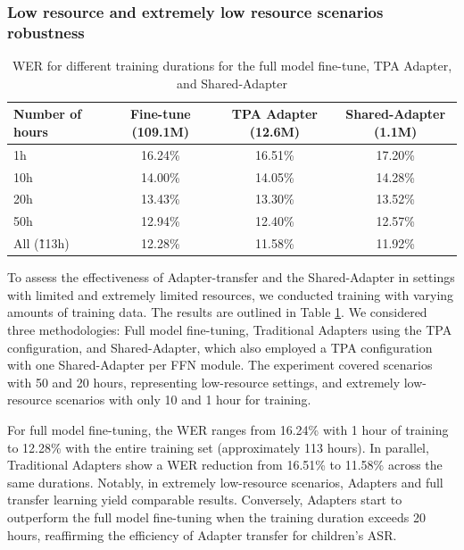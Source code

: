 
\subsubsection{Low resource and extremely low resource scenarios robustness}
\label{sec:hours_PETL}
\begin{table}[ht]
    \centering
    \begin{tabular}{l c c c}
        \hline
        Number of hours & Fine-tune (109.1M) & TPA Adapter (12.6M) & Shared-Adapter (1.1M) \\
        \hline
        1h & 16.24\% & 16.51\% & 17.20\% \\
        10h & 14.00\% & 14.05\% & 14.28\% \\
        20h & 13.43\% & 13.30\% & 13.52\% \\
        50h & 12.94\% & 12.40\% & 12.57\% \\
        All (\~113h) & 12.28\% & 11.58\% & 11.92\% \\
        \hline
    \end{tabular}
    \caption{WER for different training durations for the full model fine-tune, TPA Adapter, and Shared-Adapter}
    \label{tab:training_duration_results}
\end{table}

To assess the effectiveness of Adapter-transfer and the Shared-Adapter in settings with limited and extremely limited resources, we conducted training with varying amounts of training data. The results are outlined in Table \ref{tab:training_duration_results}. We considered three methodologies: Full model fine-tuning, Traditional Adapters using the \ac{TPA} configuration, and Shared-Adapter, which also employed a \ac{TPA} configuration with one Shared-Adapter per \ac{FFN} module. The experiment covered scenarios with 50 and 20 hours, representing low-resource settings, and extremely low-resource scenarios with only 10 and 1 hour for training.

For full model fine-tuning, the \ac{WER} ranges from 16.24\% with 1 hour of training to 12.28\% with the entire training set (approximately 113 hours). In parallel, Traditional Adapters show a \ac{WER} reduction from 16.51\% to 11.58\% across the same durations. Notably, in extremely low-resource scenarios, Adapters and full transfer learning yield comparable results. Conversely, Adapters start to outperform the full model fine-tuning when the training duration exceeds 20 hours, reaffirming the efficiency of Adapter transfer for children's \ac{ASR}.

